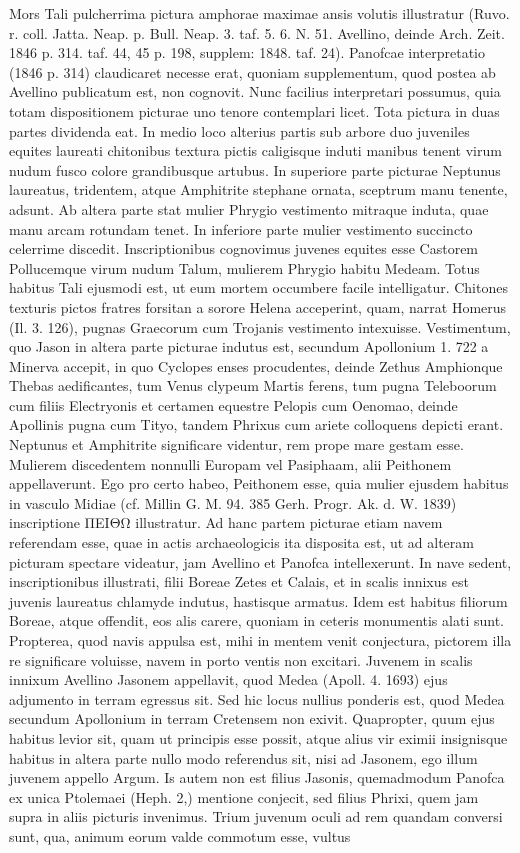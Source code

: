 \documentclass[landscape, a4paper, 11pt, oneside, polutonikogreek, german]{article}
\begin{document}
Mors Tali pulcherrima pictura amphorae maximae ansis volutis illustratur (Ruvo. r. coll. Jatta. Neap. p. Bull. Neap. 3. taf. 5. 6. N. 51. Avellino, deinde Arch. Zeit. 1846 p. 314. taf. 44, 45 p. 198, supplem: 1848. taf. 24). Panofcae interpretatio (1846 p. 314) claudicaret necesse erat, quoniam supplementum, quod postea ab Avellino publicatum est, non cognovit. Nunc facilius interpretari possumus, quia totam dispositionem picturae uno tenore contemplari licet. Tota pictura in duas partes dividenda eat. In medio loco alterius partis sub arbore duo juveniles equites laureati chitonibus textura pictis caligisque induti manibus tenent virum nudum fusco colore grandibusque artubus. In superiore parte picturae Neptunus laureatus, tridentem, atque Amphitrite stephane ornata, sceptrum manu tenente, adsunt. Ab altera parte stat mulier Phrygio vestimento mitraque induta, quae manu arcam rotundam tenet. In inferiore parte mulier vestimento succincto celerrime discedit. Inscriptionibus cognovimus juvenes equites esse Castorem Pollucemque virum nudum Talum, mulierem Phrygio habitu Medeam. Totus habitus Tali ejusmodi est, ut eum mortem occumbere facile intelligatur. Chitones texturis pictos fratres forsitan a sorore Helena acceperint, quam, narrat Homerus (Il. 3. 126), pugnas Graecorum cum Trojanis vestimento intexuisse. Vestimentum, quo Jason in altera parte picturae indutus est, secundum Apollonium 1. 722 a Minerva accepit, in quo Cyclopes enses procudentes, deinde Zethus Amphionque Thebas aedificantes, tum Venus clypeum Martis ferens, tum pugna Teleboorum cum filiis Electryonis et certamen equestre Pelopis cum Oenomao, deinde Apollinis pugna cum Tityo, tandem Phrixus cum ariete colloquens depicti erant. Neptunus et Amphitrite significare videntur, rem prope mare gestam esse. Mulierem discedentem nonnulli Europam vel Pasiphaam, alii Peithonem appellaverunt. Ego pro certo habeo, Peithonem esse, quia mulier ejusdem habitus in vasculo Midiae (cf. Millin G. M. 94. 385 Gerh. Progr. Ak. d. W. 1839) inscriptione ΠΕΙΘΩ illustratur. Ad hanc partem picturae etiam navem referendam esse, quae in actis archaeologicis ita disposita est, ut ad alteram picturam spectare videatur, jam Avellino et Panofca intellexerunt. In nave sedent, inscriptionibus illustrati, filii Boreae Zetes et Calais, et in scalis innixus est juvenis laureatus chlamyde indutus, hastisque armatus. Idem est habitus filiorum Boreae, atque offendit, eos alis carere, quoniam in ceteris monumentis alati sunt. Propterea, quod navis appulsa est, mihi in mentem venit conjectura, pictorem illa re significare voluisse, navem in porto ventis non excitari. Juvenem in scalis innixum Avellino Jasonem appellavit, quod Medea (Apoll. 4. 1693) ejus adjumento in terram egressus sit. Sed hic locus nullius ponderis est, quod Medea secundum Apollonium in terram Cretensem non exivit. Quapropter, quum ejus habitus levior sit, quam ut principis esse possit, atque alius vir eximii insignisque habitus in altera parte nullo modo referendus sit, nisi ad Jasonem, ego illum juvenem appello Argum. Is autem non est filius Jasonis, quemadmodum Panofca ex unica Ptolemaei (Heph. 2,) mentione conjecit, sed filius Phrixi, quem jam supra in aliis picturis invenimus. Trium juvenum oculi ad rem quandam conversi sunt, qua, animum eorum valde commotum esse, vultus 
\end{document}
